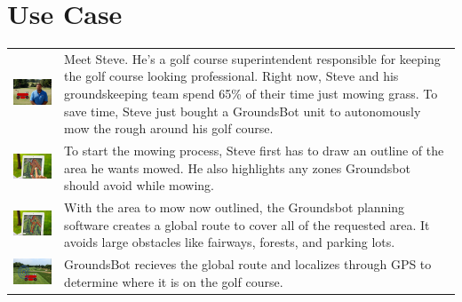 \documentclass[12pt]{extarticle}
\begin{document}
\newpage
\section{Use Case}
\begin{table}[H]
  \def\arraystretch{4}
   \setlength\tabcolsep{8pt}


\begin{tabularx}{\textwidth}{cX}
\includegraphics[width=6cm, valign=t]{usecase1_1.png} & 
Meet Steve. He's a golf course superintendent responsible for keeping the golf course looking professional. Right now, Steve and his groundskeeping team spend 65\% of their time just mowing grass. To save time, Steve just bought a GroundsBot unit to autonomously mow the rough around his golf course. \\
\includegraphics[width=6cm, valign=t]{usecase1_2.png} &
To start the mowing process, Steve first has to draw an outline of the area he wants mowed. He also highlights any zones Groundsbot should avoid while mowing.
\\
\includegraphics[width=6cm, valign=t]{usecase1_3.png} &
With the area to mow now outlined, the Groundsbot planning software creates a global route to cover all of the requested area. It avoids large obstacles like fairways, forests, and parking lots.
\\
\includegraphics[width=6cm, valign=t]{usecase1_4.png} &
GroundsBot recieves the global route and localizes through GPS to determine where it is on the golf course.
\\
\end{tabularx}
\end{table}
\end{document}
